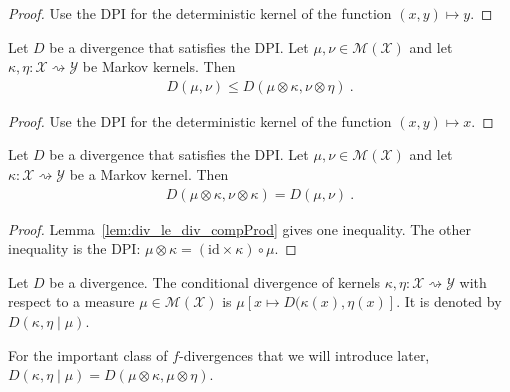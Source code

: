 \begin{proof}%
{}
Use the DPI for the deterministic kernel of the function $(x,y) \mapsto y$.
\end{proof}


\begin{lemma}
  \label{lem:div_le_div_compProd}
  Let $D$ be a divergence that satisfies the DPI. Let $\mathcal \mu, \nu \in \mathcal M(\mathcal X)$ and let $\kappa, \eta : \mathcal X \rightsquigarrow \mathcal Y$ be Markov kernels. Then
  \begin{align*}
  D(\mu, \nu) \le D(\mu \otimes \kappa, \nu \otimes \eta) \: .
  \end{align*}
\end{lemma}

\begin{proof}%
{}
Use the DPI for the deterministic kernel of the function $(x,y) \mapsto x$.
\end{proof}


\begin{lemma}
  \label{lem:div_compProd_right}
  Let $D$ be a divergence that satisfies the DPI. Let $\mathcal \mu, \nu \in \mathcal M(\mathcal X)$ and let $\kappa : \mathcal X \rightsquigarrow \mathcal Y$ be a Markov kernel. Then
  \begin{align*}
  D(\mu \otimes \kappa, \nu \otimes \kappa) = D(\mu, \nu) \: .
  \end{align*}
\end{lemma}

\begin{proof}%
{}
Lemma~\ref{lem:div_le_div_compProd} gives one inequality. The other inequality is the DPI: $\mu \otimes \kappa = (\mathrm{id} \times \kappa) \circ \mu$.
\end{proof}


\begin{definition}
  \label{def:condDiv}
  Let $D$ be a divergence.
  The conditional divergence of kernels $\kappa, \eta : \mathcal X \rightsquigarrow \mathcal Y$ with respect to a measure $\mu \in \mathcal M(\mathcal X)$ is
  $\mu[x \mapsto D(\kappa(x), \eta(x)]$.
  It is denoted by $D(\kappa, \eta \mid \mu)$.
\end{definition}

For the important class of $f$-divergences that we will introduce later, $D(\kappa, \eta \mid \mu) = D(\mu \otimes \kappa, \mu \otimes \eta)$.

